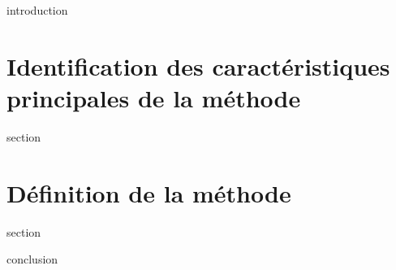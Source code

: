 \chaptertoc{}

\label{sec:4-int}
{introduction}

\section{Identification des caractéristiques principales de la
  méthode}
\label{sec:4-1}
{section}

\section{Définition de la méthode}
\label{sec:4-2}
{section}

\label{sec:4-cnc}
{conclusion}

